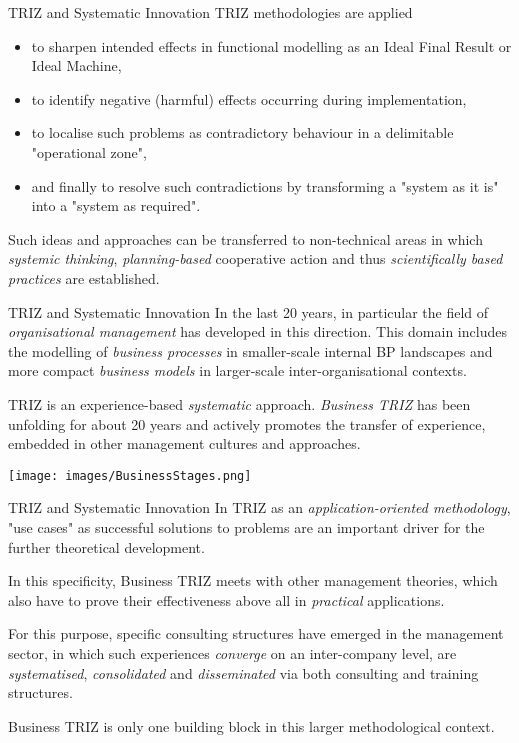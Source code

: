 \documentclass{beamer}
\begin{document}
\begin{frame}{TRIZ and Systematic Innovation}
TRIZ methodologies are applied 
\begin{itemize}
\item to sharpen intended effects in functional modelling as an Ideal Final
  Result or Ideal Machine,
\item to identify negative (harmful) effects occurring during implementation, 
\item to localise such problems as contradictory behaviour in a delimitable
  "operational zone", 
\item and finally to resolve such contradictions by transforming a "system as
  it is" into a "system as required".
\end{itemize}
Such ideas and approaches can be transferred to non-technical areas in which
\emph{systemic thinking}, \emph{planning-based} cooperative action and thus
\emph{scientifically based practices} are established.
\end{frame}

\begin{frame}{TRIZ and Systematic Innovation}\small
In the last 20 years, in particular the field of \emph{organisational
  management} has developed in this direction.  This domain includes the
modelling of \emph{business processes} in smaller-scale internal BP landscapes
and more compact \emph{business models} in larger-scale inter-organisational
contexts.

TRIZ is an experience-based \emph{systematic} approach. \emph{Business TRIZ}
has been unfolding for about 20 years and actively promotes the transfer of
experience, embedded in other management cultures and approaches.

\begin{center}
  \texttt{[image: images/BusinessStages.png]}
\end{center}
\end{frame}

\begin{frame}{TRIZ and Systematic Innovation}
In TRIZ as an \emph{application-oriented methodology}, "use cases" as
successful solutions to problems are an important driver for the further
theoretical development.

In this specificity, Business TRIZ meets with other management theories, which
also have to prove their effectiveness above all in \emph{practical}
applications.

For this purpose, specific consulting structures have emerged in the
management sector, in which such experiences \emph{converge} on an
inter-company level, are \emph{systematised}, \emph{consolidated} and
\emph{disseminated} via both consulting and training structures.

Business TRIZ is only one building block in this larger methodological
context.
\end{frame}
\end{document}

